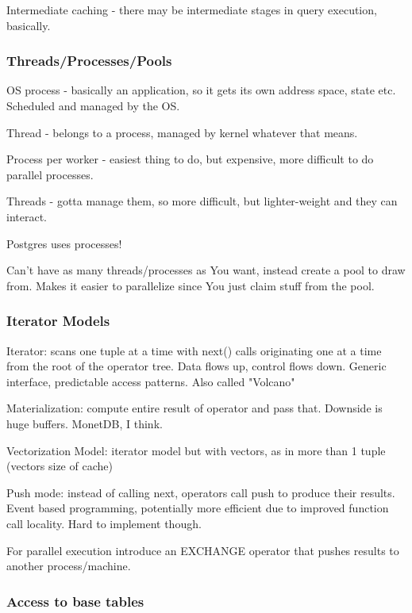 \documentclass{article}
\begin{document}
			Intermediate caching - there may be intermediate stages in query execution, basically.
			
		\subsubsection{Threads/Processes/Pools}
		
			OS process - basically an application, so it gets its own address space, state etc. Scheduled and managed by the OS.
			
			Thread - belongs to a process, managed by kernel whatever that means.
			
			Process per worker - easiest thing to do, but expensive, more difficult to do parallel processes.
			
			Threads - gotta manage them, so more difficult, but lighter-weight and they can interact.
			
			Postgres uses processes!
			
			Can't have as many threads/processes as You want, instead create a pool to draw from. Makes it easier to parallelize since You just claim stuff from the pool.
			
		\subsubsection{Iterator Models}
		
			Iterator: scans one tuple at a time with next() calls originating one at a time from the root of the operator tree. Data flows up, control flows down. Generic interface, predictable access patterns. Also called "Volcano"
			
			Materialization: compute entire result of operator and pass that. Downside is huge buffers. MonetDB, I think.
			
			Vectorization Model: iterator model but with vectors, as in more than 1 tuple (vectors size of cache)
			
			Push mode: instead of calling next, operators call push to produce their results. Event based programming, potentially more efficient due to improved function call locality. Hard to implement though.
			
			For parallel execution introduce an EXCHANGE operator that pushes results to another process/machine.
			
		\subsubsection{Access to base tables}
		
\end{document}
